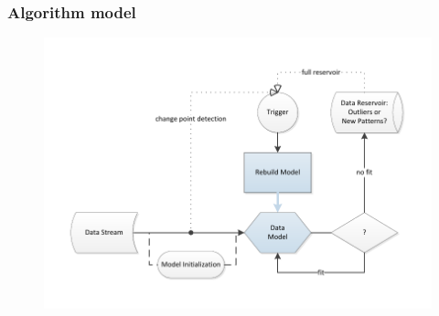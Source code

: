 \documentclass{beamer}
\begin{document}

  \begin{frame}[foot]
    \frametitle{Algorithm model} 
    \begin{figure}[htbp]
      \includegraphics[width=\textwidth]{./gfx/APC.pdf}
    \end{figure}
  \end{frame}
\end{document}
